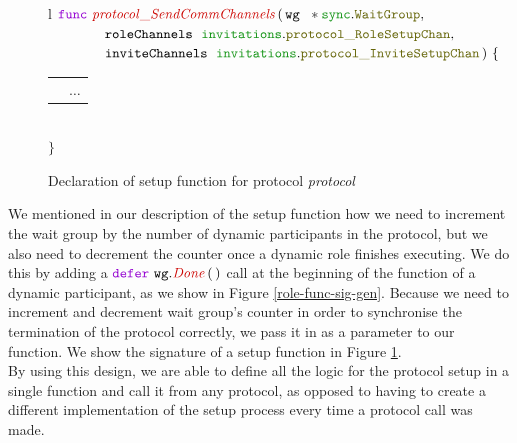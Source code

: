 \documentclass[12pt,twoside]{report}
\begin{document}
\begin{figure}[!h]
    \begin{center}
        \begin{tabular}{l}
            $\gofunc\ \functionname{protocol\_SendCommChannels} \, (\,\varname{wg}\ \;*\pkgstructaccess{sync}{WaitGroup},$\\
            
            $\qquad \qquad \varname{roleChannels}\ \;\pkgstructaccess{invitations}{protocol\_RoleSetupChan},$\\

            $\qquad \qquad \varname{inviteChannels}\ \;\pkgstructaccess{invitations}{protocol\_InviteSetupChan}\,)\ \{$\\[3pt]

            \begin{tabular}{ll}
                \indent & $\dots$\\[3.5pt]
            \end{tabular}\\[3pt]
            $\}$
        \end{tabular}
    \end{center}
    \caption{Declaration of setup function for protocol \textit{protocol}}
    \label{protocol-setup-func-gen}
\end{figure}

We mentioned in our description of the setup function how we need to increment the wait group by the number of dynamic participants in the protocol, but we also need to decrement the counter once a dynamic role finishes executing. We do this by adding a $\godefer\ \methodcall{wg}{Done}\,(\,)$ call at the beginning of the function of a dynamic participant, as we show in Figure \ref{role-func-sig-gen}. Because we need to increment and decrement wait group's counter in order to synchronise the termination of the protocol correctly, we pass it in as a parameter to our function. We show the signature of a setup function in Figure \ref{protocol-setup-func-gen}.\\

By using this design, we are able to define all the logic for the protocol setup in a single function and call it from any protocol, as opposed to having to create a different implementation of the setup process every time a protocol call was made.
\end{document}
